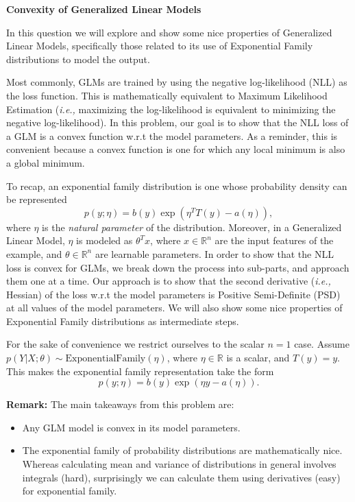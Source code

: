 \clearpage
\item {} {\bf Convexity of Generalized Linear Models}

In this question we will explore and show some nice properties of Generalized
Linear Models, specifically those related to its use of Exponential Family
distributions to model the output.

Most commonly, GLMs are trained by using the negative log-likelihood (NLL) as
the loss function. This is mathematically equivalent to Maximum Likelihood
Estimation (\emph{i.e.,} maximizing the log-likelihood is equivalent to
minimizing the negative log-likelihood). In this problem, our goal is to show
that the NLL loss of a GLM is a convex function w.r.t the model parameters. As
a reminder, this is convenient because a convex function is one for which any
local minimum is also a global minimum.

To recap, an exponential family distribution is one whose probability density
can be represented
%
\begin{equation*}
    p(y ; \eta) = b(y)\exp(\eta^TT(y) - a(\eta)),
\end{equation*}
%
where $\eta$ is the \emph{natural parameter} of the distribution. Moreover, in
a Generalized Linear Model, $\eta$ is modeled as $\theta^Tx$, where $x \in
\mathbb{R}^n$ are the input features of the example, and $\theta \in
\mathbb{R}^n$ are learnable parameters. In order to show that the NLL loss is
convex for GLMs, we break down the process into sub-parts, and approach them
one at a time. Our approach is to show that the second derivative (\emph{i.e.,}
Hessian) of the loss w.r.t the model parameters is Positive Semi-Definite (PSD)
at all values of the model parameters. We will also show some nice properties
of Exponential Family distributions as intermediate steps.

For the sake of convenience we restrict ourselves to the scalar $n=1$ case.
Assume $p(Y|X;\theta )\sim \text{ExponentialFamily}(\eta)$, where $\eta \in
\mathbb{R}$ is a scalar, and $T(y) = y$. This makes the exponential family
representation take the form
%
\begin{equation*}
    p(y ; \eta) = b(y)\exp(\eta y - a(\eta)).
\end{equation*}
%
\begin{enumerate}
    
    
    
\end{enumerate}

\textbf{Remark:} The main takeaways from this problem are:
\begin{itemize}
  \item Any GLM model is convex in its model parameters.
  \item The exponential family of probability distributions are mathematically
  nice. Whereas calculating mean and variance of distributions in general
  involves integrals (hard), surprisingly we can calculate them using
  derivatives (easy) for exponential family.
\end{itemize}
